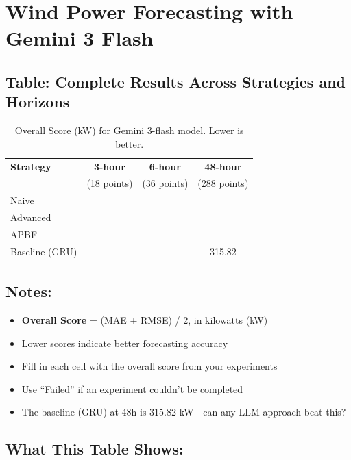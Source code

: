 \documentclass{article}
\begin{document}
\section*{Wind Power Forecasting with Gemini 3 Flash}

\subsection*{Table: Complete Results Across Strategies and Horizons}

\begin{table}[h!]
\centering
\caption{Overall Score (kW) for Gemini 3-flash model. Lower is better.}
\label{tab:gemini_results}
\begin{tabular}{lccc}
\toprule
\textbf{Strategy} & \textbf{3-hour} & \textbf{6-hour} & \textbf{48-hour} \\
& (18 points) & (36 points) & (288 points) \\
\midrule
Naive         & & & \\[0.5cm]
Advanced      & & & \\[0.5cm]
APBF          & & & \\[0.5cm]
\midrule
Baseline (GRU) & -- & -- & 315.82 \\
\bottomrule
\end{tabular}
\end{table}

\vspace{0.5cm}

\subsection*{Notes:}
\begin{itemize}
\item \textbf{Overall Score} = (MAE + RMSE) / 2, in kilowatts (kW)
\item Lower scores indicate better forecasting accuracy
\item Fill in each cell with the overall score from your experiments
\item Use ``Failed'' if an experiment couldn't be completed
\item The baseline (GRU) at 48h is 315.82 kW - can any LLM approach beat this?
\end{itemize}

\subsection*{What This Table Shows:}
\end{document}
